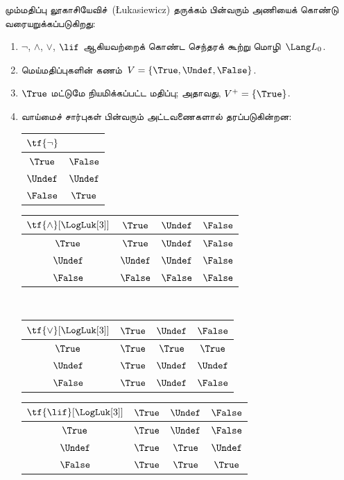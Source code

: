 \documentclass[../../../include/open-logic-section]{subfiles}
\begin{document}
\begin{defn}
மும்மதிப்பு லூகாசியேவிச்~(\L ukasiewicz) தருக்கம் பின்வரும் அணியைக் கொண்டு
வரையறுக்கப்படுகிறது:
\begin{enumerate}
  \item $\lnot$, $\land$, $\lor$, $\lif$ ஆகியவற்றைக் கொண்ட செந்தரக்
  கூற்று மொழி~$\Lang L_0$.
  \item மெய்மதிப்புகளின் கணம்~$V = \{\True, \Undef, \False\}$.
  \item $\True$ மட்டுமே நியமிக்கப்பட்ட மதிப்பு; அதாவது,
  $V^+ = \{\True\}$.
  \item வாய்மைச் சார்புகள் பின்வரும் அட்டவணைகளால் தரப்படுகின்றன:
  \begin{center}
    \begin{tabular}{c|c}
      $\tf{\lnot}$ & \\
      \hline
      $\True$ & $\False$ \\
      $\Undef$ & $\Undef$ \\
      $\False$ & $\True$
    \end{tabular}
    \quad
    \begin{tabular}{c|ccc}
      $\tf{\land}[\LogLuk[3]]$ & $\True$ & $\Undef$ & $\False$ \\
      \hline
      $\True$ & $\True$ & $\Undef$ & $\False$ \\
      $\Undef$ & $\Undef$ & $\Undef$ & $\False$\\
      $\False$ & $\False$ & $\False$ & $\False$
    \end{tabular}
    \\[2ex]
    \begin{tabular}{c|ccc}
      $\tf{\lor}[\LogLuk[3]]$ & $\True$ & $\Undef$ & $\False$ \\
      \hline
      $\True$ & $\True$ & $\True$ & $\True$ \\
      $\Undef$ & $\True$ & $\Undef$ & $\Undef$ \\
      $\False$ & $\True$ & $\Undef$ & $\False$
    \end{tabular}
    \quad
    \begin{tabular}{c|ccc}
      $\tf{\lif}[\LogLuk[3]]$ & $\True$ & $\Undef$ & $\False$ \\
      \hline
      $\True$ & $\True$ & $\Undef$ & $\False$ \\
      $\Undef$ & $\True$ & $\True$ & $\Undef$  \\
      $\False$ & $\True$ & $\True$ & $\True$
    \end{tabular}
  \end{center}
\end{enumerate}
\end{defn}
\end{document}
